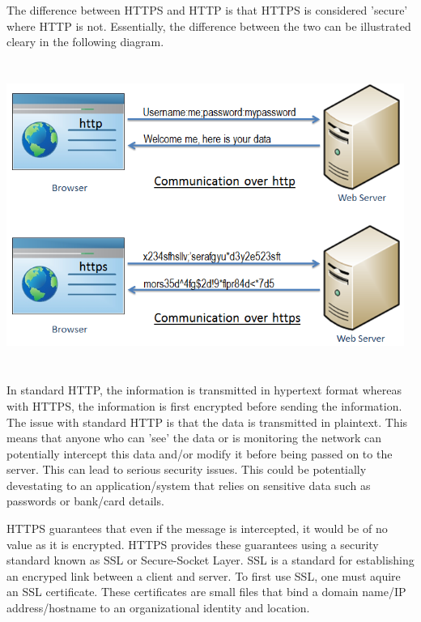     The difference between HTTPS and HTTP is that HTTPS is considered 'secure' where HTTP is not. Essentially, the difference between the two can be illustrated cleary in the following diagram.

    \begin{center}    
      \includegraphics[width=13cm, height=10cm]{img/HTTPS.png}
    \end{center}

    In standard HTTP, the information is transmitted in hypertext format whereas with HTTPS, the information is first encrypted before sending the information.
    The issue with standard HTTP is that the data is transmitted in plaintext. This means that anyone who can 'see' the data or is monitoring the network can potentially intercept this data and/or modify it before being passed on to the server. This can 
    lead to serious security issues. This could be potentially devestating to an application/system that relies on sensitive data such as passwords or bank/card details.

    HTTPS guarantees that even if the message is intercepted, it would be of no value as it is encrypted. HTTPS provides these guarantees using a security standard known as SSL or Secure-Socket Layer.
    SSL is a standard for establishing an encryped link between a client and server. To first use SSL, one must aquire an SSL certificate. These certificates are small files that bind a domain name/IP address/hostname to an organizational identity and location.

